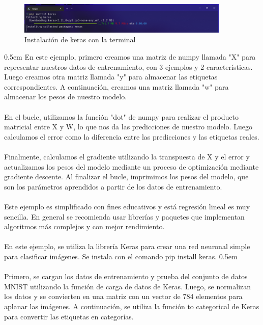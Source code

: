 \documentclass{article}
\theoremstyle{mytheoremstyle}
\theoremstyle{mytheoremstyle}
\theoremstyle{myproblemstyle}
\begin{document}
\begin{figure}[ht]
    \centering
    \includegraphics[width=0.9\textwidth]{terminal2.png}
    \caption{ Instalación de keras con la terminal}
    \label{fig:2}
\end{figure}
\parskip 0.5em
En este ejemplo, primero creamos una matriz de numpy llamada "X" para representar nuestros datos de entrenamiento, con 3 ejemplos y 2 características. Luego creamos otra matriz llamada "y" para almacenar las etiquetas correspondientes. A continuación, creamos una matriz llamada "w" para almacenar los pesos de nuestro modelo.
\\
\\
En el bucle, utilizamos la función "dot" de numpy para realizar el producto matricial entre X y W, lo que nos da las predicciones de nuestro modelo. Luego calculamos el error como la diferencia entre las predicciones y las etiquetas reales.
\\
\\
Finalmente, calculamos el gradiente utilizando la transpuesta de X y el error y actualizamos los pesos del modelo mediante un proceso de optimización mediante gradiente descente. Al finalizar el bucle, imprimimos los pesos del modelo, que son los parámetros aprendidos a partir de los datos de entrenamiento.
\\
\\
Este ejemplo es simplificado con fines educativos y está regresión lineal es muy sencilla. En general se recomienda usar librerías y paquetes que implementan algoritmos más complejos y con mejor rendimiento.
\\
\\
En este ejemplo, se utiliza la librería Keras para crear una red neuronal simple para clasificar imágenes. Se instala con el comando pip install keras.
\parskip 0.5em
\\
\\
Primero, se cargan los datos de entrenamiento y prueba del conjunto de datos MNIST utilizando la función de carga de datos de Keras. Luego, se normalizan los datos y se convierten en una matriz con un vector de 784 elementos para aplanar las imágenes. A continuación, se utiliza la función to categorical de Keras para convertir las etiquetas en categorías.
\\
\\
\end{document}

